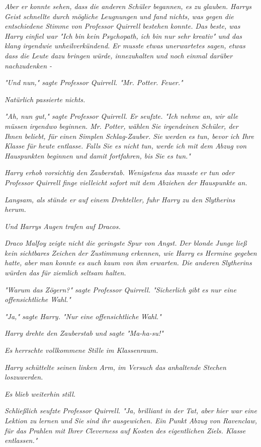 {\emph{Aber er konnte sehen, dass die anderen Schüler begannen, es zu glauben. Harrys Geist schnellte durch mögliche Leugnungen und fand nichts, was gegen die entschiedene Stimme von Professor Quirrell bestehen konnte. Das beste, was Harry einfiel war "Ich bin kein Psychopath, ich bin nur sehr kreativ" und das klang irgendwie unheilverkündend. Er musste etwas unerwartetes sagen, etwas dass die Leute dazu bringen würde, innezuhalten und noch einmal darüber nachzudenken -}

\emph{"Und nun," sagte Professor Quirrell. "Mr. Potter. Feuer."}

\emph{Natürlich passierte nichts.}

\emph{"Ah, nun gut," sagte Professor Quirrell. Er seufzte. "Ich nehme an, wir alle müssen irgendwo beginnen. Mr. Potter, wählen Sie irgendeinen Schüler, der Ihnen beliebt, für einen Simplen Schlag-Zauber. Sie} \emph{\emph{werden}} \emph{es tun, bevor ich Ihre Klasse für heute entlasse. Falls Sie es nicht tun, werde ich mit dem Abzug von Hauspunkten beginnen und damit fortfahren, bis Sie es tun."}

\emph{Harry erhob vorsichtig den Zauberstab. Wenigstens das musste er tun oder Professor Quirrell finge vielleicht sofort mit dem Abziehen der Hauspunkte an.}

\emph{Langsam, als stünde er auf einem Drehteller, fuhr Harry zu den Slytherins herum.}

\emph{Und Harrys Augen trafen auf Dracos.}

\emph{Draco Malfoy zeigte nicht die geringste Spur von Angst. Der blonde Junge ließ kein sichtbares Zeichen der Zustimmung erkennen, wie Harry es Hermine gegeben hatte, aber man konnte es auch kaum von ihm erwarten. Die anderen Slytherins würden das für ziemlich seltsam halten.}

\emph{"Warum das Zögern?" sagte Professor Quirrell. "Sicherlich gibt es nur eine offensichtliche Wahl."}

\emph{"Ja," sagte Harry. "Nur eine} \emph{\emph{offensichtliche}} \emph{Wahl."}

\emph{Harry drehte den Zauberstab und sagte "\emph{Ma-ha-su!}"}

\emph{Es herrschte vollkommene Stille im Klassenraum.}

\emph{Harry schüttelte seinen linken Arm, im Versuch das anhaltende Stechen loszuwerden.}

\emph{Es blieb weiterhin still.}

\emph{Schließlich seufzte Professor Quirrell. "Ja, brilliant in der Tat, aber hier war eine Lektion zu lernen und Sie sind ihr ausgewichen. Ein Punkt Abzug von Ravenclaw, für das Prahlen mit Ihrer Cleverness auf Kosten des eigentlichen Ziels. Klasse entlassen."}

}
